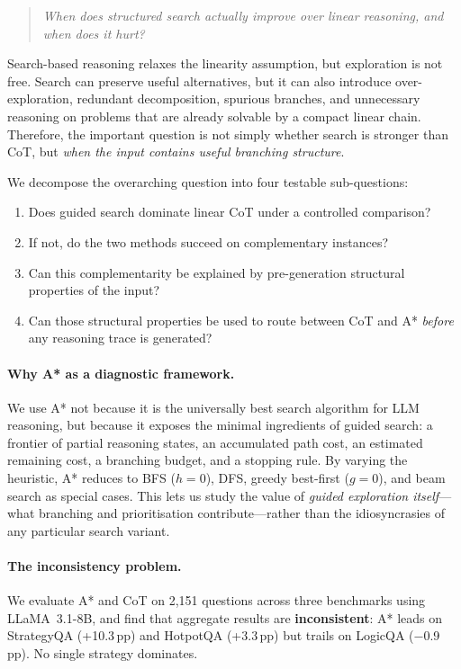 \documentclass[11pt]{article}
\newcommand{\pp}{\,pp\xspace}
\begin{document}
\begin{quote}
\emph{When does structured search actually improve over linear reasoning, and
when does it hurt?}
\end{quote}

Search-based reasoning relaxes the linearity assumption, but exploration is not
free.  Search can preserve useful alternatives, but it can also introduce
over-exploration, redundant decomposition, spurious branches, and unnecessary
reasoning on problems that are already solvable by a compact linear chain.
Therefore, the important question is not simply whether search is stronger than
CoT, but \emph{when the input contains useful branching structure}.

We decompose the overarching question into four testable sub-questions:
\begin{enumerate}[leftmargin=2em,itemsep=2pt,label=(\roman*)]
\item Does guided search dominate linear CoT under a controlled comparison?
\item If not, do the two methods succeed on complementary instances?
\item Can this complementarity be explained by pre-generation structural
  properties of the input?
\item Can those structural properties be used to route between CoT and A*
  \emph{before} any reasoning trace is generated?
\end{enumerate}

\paragraph{Why A* as a diagnostic framework.}
We use A* not because it is the universally best search algorithm for LLM
reasoning, but because it exposes the minimal ingredients of guided search: a
frontier of partial reasoning states, an accumulated path cost, an estimated
remaining cost, a branching budget, and a stopping rule.  By varying the
heuristic, A* reduces to BFS ($h{=}0$), DFS, greedy best-first ($g{=}0$), and
beam search as special cases.  This lets us study the value of
\emph{guided exploration itself}---what branching and prioritisation
contribute---rather than the idiosyncrasies of any particular search variant.

\paragraph{The inconsistency problem.}
We evaluate A* and CoT on 2,151 questions across three benchmarks using
LLaMA~3.1-8B, and find that aggregate results are \textbf{inconsistent}: A*
leads on StrategyQA (+10.3\pp) and HotpotQA (+3.3\pp) but trails on
LogicQA ($-$0.9\pp).  No single strategy dominates.
\end{document}
